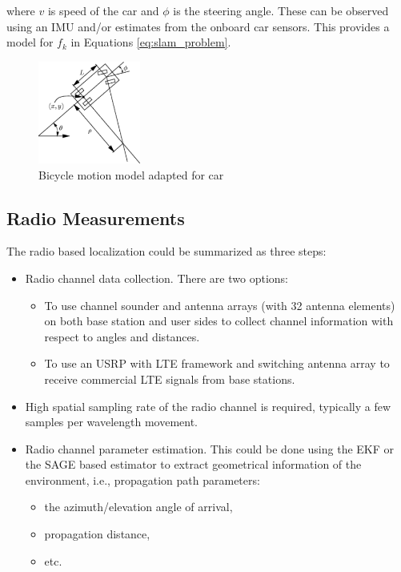 where $v$ is speed of the car and $\phi$ is the steering angle.
These can be observed using an \gls{IMU} and/or estimates from the onboard car
sensors. This provides a model for $f_k$ in Equations \eqref{eq:slam_problem}.

\begin{figure}
\centering
\label{fig:motion_model}
\includegraphics[width=0.3\textwidth]{figures/bicycle_model.pdf}
\caption{Bicycle motion model adapted for car}
\end{figure}


\subsection{Radio Measurements}\label{sec:radio_measurements}


The radio based localization could be summarized as three steps:

\begin{itemize}
\item Radio channel data collection. There are two options:
  \begin{itemize}
  \item To use channel sounder and antenna arrays (with 32 antenna
    elements) on both base station and user sides to collect channel
    information with respect to angles and distances.
  \item To use an \gls{USRP} with \gls{LTE} framework and switching antenna array to
  receive commercial \gls{LTE} signals from base stations.
\end{itemize}
\item  High spatial sampling rate of the radio channel is required, typically a few samples per wavelength movement.
\item Radio channel parameter estimation. This could be done using the \gls{EKF} or the
\gls{SAGE} based estimator
to extract geometrical information of the environment, i.e., propagation path
parameters:
\begin{itemize}
\item the azimuth/elevation angle of arrival,
\item propagation
distance,
\item etc.
\end{itemize}
\end{itemize}

